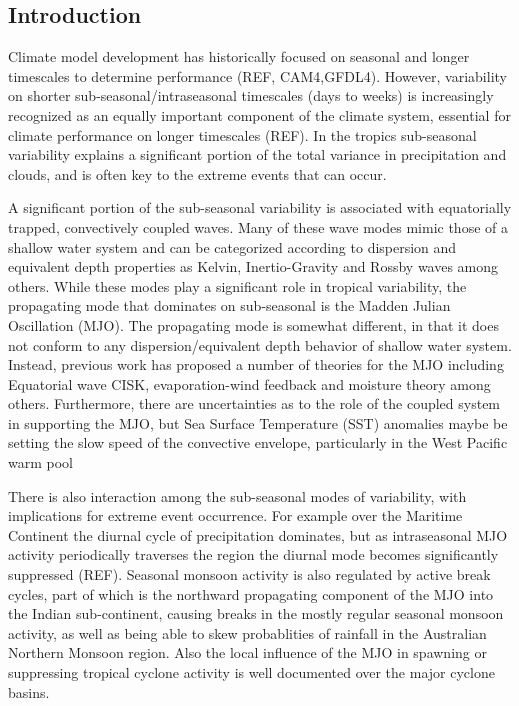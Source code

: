 \documentclass[draft,ms]{AGUTeX}
\begin{document}
\begin{article}

%
%

\section{Introduction}
Climate model development has historically focused on seasonal and longer timescales to determine performance (REF, CAM4,GFDL4). However, variability on shorter sub-seasonal/intraseasonal timescales (days to weeks) is increasingly recognized as an equally important component of the climate system, essential for climate performance on longer timescales (REF). In the tropics sub-seasonal variability explains a significant portion of the total variance in precipitation and clouds, and is often key to the extreme events that can occur. 

A significant portion of the sub-seasonal variability is associated with equatorially trapped, convectively coupled waves. Many of these wave modes mimic those of a shallow water system and can be categorized according to dispersion and equivalent depth properties as Kelvin, Inertio-Gravity and Rossby waves among others. While these modes play a significant role in tropical variability, the propagating mode that dominates on sub-seasonal is the Madden Julian Oscillation (MJO). The propagating mode is somewhat different, in that it does not conform to any dispersion/equivalent depth behavior of shallow water system. Instead, previous work has proposed a number of theories for the MJO including Equatorial wave CISK, evaporation-wind feedback and moisture theory among others. Furthermore, there are uncertainties as to the role of the coupled system in supporting the MJO, but Sea Surface Temperature (SST) anomalies maybe be setting the slow speed of the convective envelope, particularly in the West Pacific warm pool    

There is also interaction among the sub-seasonal modes of variability, with implications for extreme event occurrence. For example over the Maritime Continent the diurnal cycle of precipitation dominates, but as intraseasonal MJO activity periodically traverses the region the diurnal mode becomes significantly suppressed (REF). Seasonal monsoon activity is also regulated by active break cycles, part of which is the northward propagating component of the MJO into the Indian sub-continent, causing breaks in the mostly regular seasonal monsoon activity, as well as being able to skew probablities of rainfall in the Australian Northern Monsoon region. Also the local influence of the MJO in spawning or suppressing tropical cyclone activity is well documented over the major cyclone basins. 


\end{article}
\end{document}
